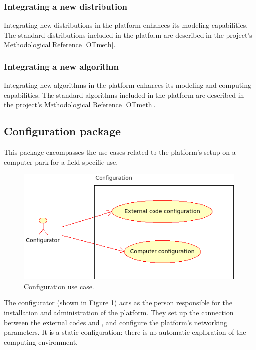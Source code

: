 \subsubsection{Integrating a new distribution}

Integrating new distributions in the platform enhances its modeling capabilities. The standard distributions included in the platform are described in the project's Methodological Reference [OTmeth].

\subsubsection{Integrating a new algorithm}

Integrating new algorithms in the platform enhances its modeling and computing capabilities. The standard algorithms included in the platform are described in the project's Methodological Reference [OTmeth].

\subsection{Configuration package}

This package encompasses the use cases related to the platform's setup on a computer park for a field-specific use.

\begin{figure}[htb]
  \begin{center}
    \includegraphics[scale=0.8]{Figures/analysis/configuration.png}
    \caption{Configuration use case.}\label{fig:configuration}
  \end{center}
\end{figure}

The configurator (shown in Figure \ref{fig:configuration}) acts as the person responsible for the installation and administration of the platform. They set up the connection between the external codes and \OT, and configure the platform's networking parameters. It is a static configuration: there is no automatic exploration of the computing environment.

